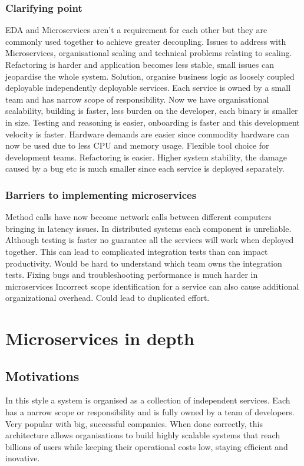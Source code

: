 \documentclass[a4paper, 11pt]{book}
\begin{document}
    \subsection{Clarifying point} EDA and Microservices aren't a requirement for each other but they are commonly used together to achieve greater decoupling.
    Issues to address with Microservices, organisational scaling and technical problems relating to scaling.
    Refactoring is harder and application becomes less stable, small issues can jeopardise the whole system.
    Solution, organise business logic as loosely coupled deployable independently deployable services.
    Each service is owned by a small team and has narrow scope of responsibility.
    Now we have organisational scalability, building is faster, less burden on the developer, each binary is smaller in size.
    Testing and reasoning is easier, onboarding is faster and this development velocity is faster.
    Hardware demands are easier since commodity hardware can now be used due to less CPU and memory usage.
    Flexible tool choice for development teams.
    Refactoring is easier.
    Higher system stability, the damage caused by a bug etc is much smaller since each service is deployed separately.

    \subsection{Barriers to implementing microservices}
    Method calls have now become network calls between different computers bringing in latency issues.
    In distributed systems each component is unreliable.
    Although testing is faster no guarantee all the services will work when deployed together.
    This can lead to complicated integration tests than can impact productivity.
    Would be hard to understand which team owns the integration tests.
    Fixing bugs and troubleshooting performance is much harder in microservices
    Incorrect scope identification for a service can also cause additional organizational overhead.
    Could lead to duplicated effort.


    \chapter{Microservices in depth}


    \section{Motivations}
    In this style a system is organised as a collection of independent services.
    Each has a narrow scope or responsibility and is fully owned by a team of developers.
    Very popular with big, successful companies.
    When done correctly, this architecture allows organisations to build highly scalable systems that reach billions of users while keeping their operational costs low, staying efficient and inovative.
\end{document}
